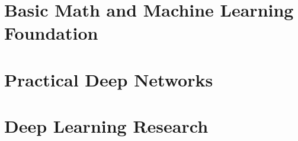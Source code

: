 \documentclass[10pt,a5paper,twoside,openright]{book}
\theoremstyle{definition}
\theoremstyle{remark}
\begin{document}
\mainmatter



\part{Basic Math and Machine Learning Foundation}









\part{Practical Deep Networks}















\part{Deep Learning Research}
\end{document}
